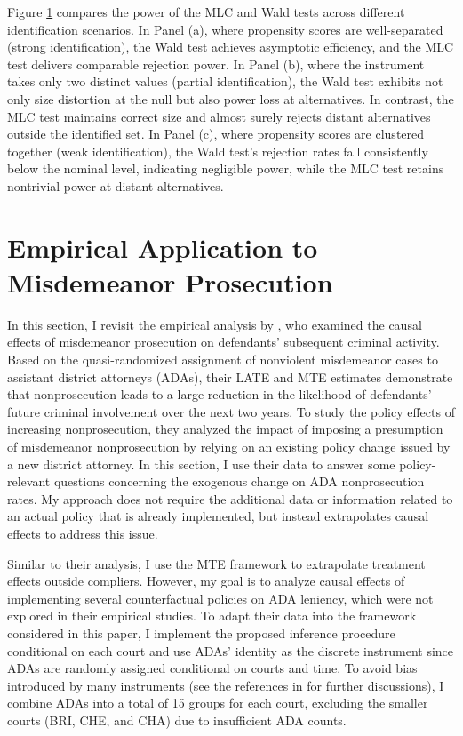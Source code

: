 \documentclass[11pt]{article}
\theoremstyle{definition}
\newcommand{\0}{\ensuremath{\mathbf{0}}}
\begin{document}
\begin{bibunit}
\begin{figure}[htbp]
  \label{fig:power_curve_ATE}
  
\end{figure}
  
Figure \ref{fig:power_curve_ATE} compares the power of the MLC and Wald tests across different identification scenarios. In Panel (a), where propensity scores are well-separated (strong identification), the Wald test achieves asymptotic efficiency, and the MLC test delivers comparable rejection power. In Panel (b), where the instrument takes only two distinct values (partial identification), the Wald test exhibits not only size distortion at the null but also power loss at alternatives. In contrast, the MLC test maintains correct size and almost surely rejects distant alternatives outside the identified set. In Panel (c), where propensity scores are clustered together (weak identification), the Wald test's rejection rates fall consistently below the nominal level, indicating negligible power, while the MLC test retains nontrivial power at distant alternatives.

%

%
\section{Empirical Application to Misdemeanor Prosecution}
\label{sec:empirical}
In this section, I revisit the empirical analysis by \cite{agan/doleac/harvey:2023}, who examined the causal effects of misdemeanor prosecution on defendants' subsequent criminal activity. Based on the quasi-randomized assignment of nonviolent misdemeanor cases to assistant district attorneys (ADAs), their LATE and MTE estimates demonstrate that nonprosecution leads to a large reduction in the likelihood of defendants' future criminal involvement over the next two years. To study the policy effects of increasing nonprosecution, they analyzed the impact of imposing a presumption of misdemeanor nonprosecution by relying on an existing policy change issued by a new district attorney. In this section, I use their data to answer some policy-relevant questions concerning the exogenous change on ADA nonprosecution rates. My approach does not require the additional data or information related to an actual policy that is already implemented, but instead extrapolates causal effects to address this issue. 

Similar to their analysis, I use the MTE framework to extrapolate treatment effects outside compliers. However, my goal is to analyze causal effects of implementing several counterfactual policies on ADA leniency, which were not explored in their empirical studies. To adapt their data into the framework considered in this paper, I implement the proposed inference procedure conditional on each court and use ADAs' identity as the discrete instrument since ADAs are randomly assigned conditional on courts and time. To avoid bias introduced by many instruments (see the references in \cite{mikusheva/sun:2022} for further discussions), I combine ADAs into a total of 15 groups for each court, excluding the smaller courts (BRI, CHE, and CHA) due to insufficient ADA counts.


\end{bibunit}
\end{document}
